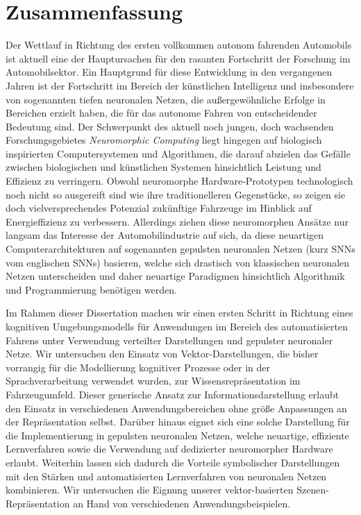 \chapter*{Zusammenfassung}

Der Wettlauf in Richtung des ersten vollkommen autonom fahrenden Automobils ist aktuell eine der Hauptursachen f\"ur den rasanten Fortschritt der Forschung im Automobilsektor.
Ein Hauptgrund f\"ur diese Entwicklung in den vergangenen Jahren ist der Fortschritt im Bereich der k\"unstlichen Intelligenz und insbesondere von sogenannten tiefen neuronalen Netzen, die au{\ss}ergew\"ohnliche Erfolge in Bereichen erzielt haben, die f\"ur das autonome Fahren von entscheidender Bedeutung sind.
Der Schwerpunkt des aktuell noch jungen, doch wachsenden Forschungsgebietes \emph{Neuromorphic Computing} liegt hingegen auf biologisch inspirierten Computersystemen und Algorithmen, die darauf abzielen das Gef\"alle zwischen biologischen und k\"unstlichen Systemen hinsichtlich Leistung und Effizienz zu verringern.
Obwohl neuromorphe Hardware-Prototypen technologisch noch nicht so ausgereift sind wie ihre traditionelleren Gegenst\"ucke, so zeigen sie doch vielversprechendes Potenzial zuk\"unftige Fahrzeuge im Hinblick auf Energieffizienz zu verbessern.
Allerdings ziehen diese neuromorphen Ans\"atze nur langsam das Interesse der Automobilindustrie auf sich, da diese neuartigen Computerarchitekturen auf sogenannten gepulsten neuronalen Netzen (kurz \acsp{SNN} vom englischen \aclp{SNN}) basieren, welche sich drastisch von klassischen neuronalen Netzen unterscheiden und daher neuartige Paradigmen hinsichtlich Algorithmik und Programmierung ben\"otigen werden.

Im Rahmen dieser Dissertation machen wir einen ersten Schritt in Richtung eines kognitiven Umgebungsmodells f\"ur Anwendungen im Bereich des automatisierten Fahrens unter Verwendung verteilter Darstellungen und gepulster neuronaler Netze.
Wir untersuchen den Einsatz von Vektor-Darstellungen, die bisher vorrangig f\"ur die Modellierung kognitiver Prozesse oder in der Sprachverarbeitung verwendet wurden, zur Wissensrepr\"asentation im Fahrzeugumfeld.
Dieser generische Ansatz zur Informationsdarstellung erlaubt den Einsatz in verschiedenen Anwendungsbereichen ohne gr\"o{\ss}e Anpassungen an der Repr\"asentation selbst.
Dar\"uber hinaus eignet sich eine solche Darstellung f\"ur die Implementierung in gepulsten neuronalen Netzen, welche neuartige, effiziente Lernverfahren sowie die Verwendung auf dedizierter neuromorpher Hardware erlaubt.
Weiterhin lassen sich dadurch die Vorteile symbolischer Darstellungen mit den St\"arken und automatisierten Lernverfahren von neuronalen Netzen kombinieren.
Wir untersuchen die Eignung unserer vektor-basierten Szenen-Repr\"asentation an Hand von verschiedenen Anwendungsbeispielen.

